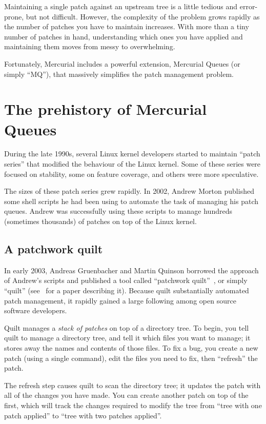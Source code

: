 Maintaining a single patch against an upstream tree is a little
tedious and error-prone, but not difficult.  However, the complexity
of the problem grows rapidly as the number of patches you have to
maintain increases.  With more than a tiny number of patches in hand,
understanding which ones you have applied and maintaining them moves
from messy to overwhelming.

Fortunately, Mercurial includes a powerful extension, Mercurial Queues
(or simply ``MQ''), that massively simplifies the patch management
problem.

\section{The prehistory of Mercurial Queues}
\label{sec:mq:history}

During the late 1990s, several Linux kernel developers started to
maintain ``patch series'' that modified the behaviour of the Linux
kernel.  Some of these series were focused on stability, some on
feature coverage, and others were more speculative.

The sizes of these patch series grew rapidly.  In 2002, Andrew Morton
published some shell scripts he had been using to automate the task of
managing his patch queues.  Andrew was successfully using these
scripts to manage hundreds (sometimes thousands) of patches on top of
the Linux kernel.

\subsection{A patchwork quilt}
\label{sec:mq:quilt}

In early 2003, Andreas Gruenbacher and Martin Quinson borrowed the
approach of Andrew's scripts and published a tool called ``patchwork
quilt''~\cite{web:quilt}, or simply ``quilt''
(see~\cite{gruenbacher:2005} for a paper describing it).  Because
quilt substantially automated patch management, it rapidly gained a
large following among open source software developers.

Quilt manages a \emph{stack of patches} on top of a directory tree.
To begin, you tell quilt to manage a directory tree, and tell it which
files you want to manage; it stores away the names and contents of
those files.  To fix a bug, you create a new patch (using a single
command), edit the files you need to fix, then ``refresh'' the patch.

The refresh step causes quilt to scan the directory tree; it updates
the patch with all of the changes you have made.  You can create
another patch on top of the first, which will track the changes
required to modify the tree from ``tree with one patch applied'' to
``tree with two patches applied''.

